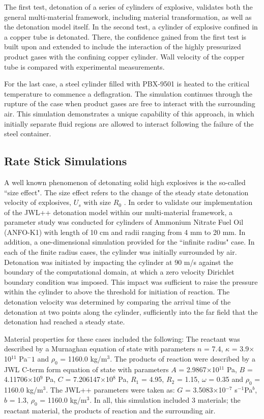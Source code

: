   The first test, detonation of a series of cylinders of explosive, validates 
  both the general multi-material framework, including material 
  transformation, as well as the detonation model itself.  In the second 
  test, a cylinder of explosive confined in a copper tube is 
  detonated.  There, the confidence gained from the 
  first test is built upon and extended to include the interaction of the highly
  pressurized product gases with the confining copper cylinder.  Wall velocity 
  of the copper tube is compared with experimental measurements.

  For the last case, a steel cylinder filled with PBX-9501 is heated to the 
  critical temperature to commence a deflagration.  The simulation continues 
  through the rupture of the case when product gases are 
  free to interact with the surrounding air.  This simulation demonstrates a 
  unique capability of this approach, in which initially separate fluid 
  regions are allowed to interact following the failure of the steel container.

\subsection{Rate Stick Simulations}

A well known phenomenon of detonating solid high explosives is the 
so-called ``size effect".  The size effect refers to the change of the 
steady state detonation velocity of explosives, $U_s$ with size $R_0$
\cite{JWLpp}.  In order to validate our implementation of the JWL++ 
detonation model within our multi-material framework, a parameter study 
was conducted for cylinders of Ammonium Nitrate Fuel Oil (ANFO-K1) with 
length of 10 cm and radii ranging from 4 mm to 20 mm.  In addition, a 
one-dimensional simulation provided for the ``infinite radius" case.  In each of the finite radius 
cases, the cylinder was initially surrounded by air.  Detonation was 
initiated by impacting the cylinder at 90 m/s against the boundary of the 
computational domain, at which a zero velocity Dirichlet boundary condition 
was imposed.  This impact was sufficient to raise the pressure within the 
cylinder to above the threshold for initiation of reaction.  The detonation 
velocity was determined by comparing the arrival time of the detonation at 
two points along the cylinder, sufficiently into the far field that the
detonation had reached a steady state.

Material properties for these cases included the following:  The reactant was 
described by a Murnaghan equation of state with parameters $n$ = 7.4, 
$\kappa$ = 3.9$\times$10$^{11}$ Pa$^-1$ and $\rho_0$ = 1160.0 kg/m$^3$.  The products of 
reaction were described by a JWL C-term form  equation of state with parameters
$A$ = 2.9867$\times$10$^{11}$ Pa, $B$ = 4.11706$\times$10$^9$ Pa, $C$ = 7.206147$\times$10$^8$ Pa, $R_1$ = 4.95, 
$R_2$ = 1.15, $\omega$ = 0.35 and $\rho_0$ = 1160.0 kg/m$^3$.  The JWL++ parameters 
were taken as: $G$ = 3.5083$\times$10$^{-7}$ s$^{-1}$Pa$^b$, $b$ = 1.3, $\rho_0$ = 1160.0 kg/m$^3$.  
In all, this simulation included 3 materials; the reactant material, the 
products of reaction and the surrounding air.

